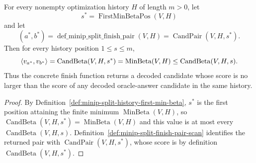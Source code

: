 \begin{lemma}
  \label{lem:minip-split-finish-pair-minimal}
  For every nonempty optimization history $H$ of length $m>0$, let
  \[
    s^*=\operatorname{FirstMinBetaPos}(V,H)
  \]
  and let
  \[
    (a^*,b^*)=
      \operatorname{def\_minip\_split\_finish\_pair}(V,H)
      =
      \operatorname{CandPair}(V,H,s^*).
  \]
  Then for every history position $1\leq s\leq m$,
  \[
    \left\langle v_{a^*},v_{b^*}\right\rangle
    =
    \operatorname{CandBeta}(V,H,s^*)
    =
    \operatorname{MinBeta}(V,H)
    \leq
    \operatorname{CandBeta}(V,H,s).
  \]
  Thus the concrete finish function returns a decoded candidate whose score is
  no larger than the score of any decoded oracle-answer candidate in the same
  history.
\end{lemma}
\begin{proof}
  By Definition~\ref{def:minip-split-history-first-min-beta},
  $s^*$ is the first position attaining the finite minimum
  $\operatorname{MinBeta}(V,H)$, so
  $\operatorname{CandBeta}(V,H,s^*)=\operatorname{MinBeta}(V,H)$ and this value
  is at most every $\operatorname{CandBeta}(V,H,s)$.  Definition~\ref{def:minip-split-finish-pair-scan}
  identifies the returned pair with
  $\operatorname{CandPair}(V,H,s^*)$, whose score is by definition
  $\operatorname{CandBeta}(V,H,s^*)$.
\end{proof}

